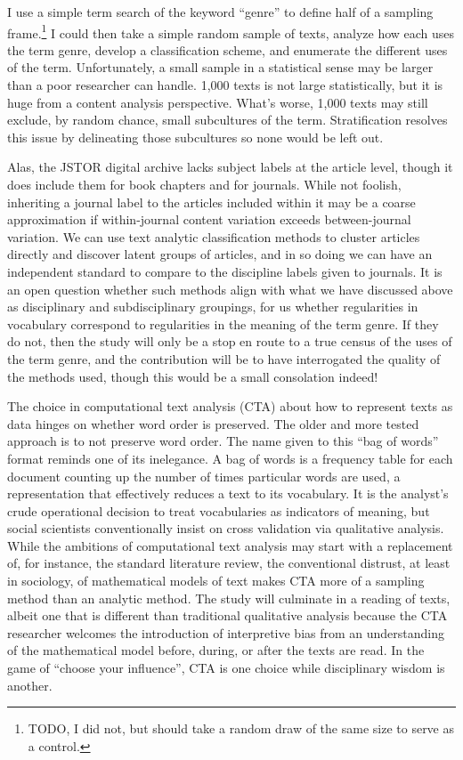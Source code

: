 \documentclass[]{book}
\let\rmarkdownfootnote\footnote%
\def\footnote{\protect\rmarkdownfootnote}
\theoremstyle{definition}
\theoremstyle{definition}
\theoremstyle{definition}
\theoremstyle{remark}
\begin{document}
I use a simple term search of the keyword ``genre'' to define half of a
sampling frame.\footnote{TODO, I did not, but should take a random draw
  of the same size to serve as a control.} I could then take a simple
random sample of texts, analyze how each uses the term genre, develop a
classification scheme, and enumerate the different uses of the term.
Unfortunately, a small sample in a statistical sense may be larger than
a poor researcher can handle. 1,000 texts is not large statistically,
but it is huge from a content analysis perspective. What's worse, 1,000
texts may still exclude, by random chance, small subcultures of the
term. Stratification resolves this issue by delineating those
subcultures so none would be left out.

Alas, the JSTOR digital archive lacks subject labels at the article
level, though it does include them for book chapters and for journals.
While not foolish, inheriting a journal label to the articles included
within it may be a coarse approximation if within-journal content
variation exceeds between-journal variation. We can use text analytic
classification methods to cluster articles directly and discover latent
groups of articles, and in so doing we can have an independent standard
to compare to the discipline labels given to journals. It is an open
question whether such methods align with what we have discussed above as
disciplinary and subdisciplinary groupings, for us whether regularities
in vocabulary correspond to regularities in the meaning of the term
genre. If they do not, then the study will only be a stop en route to a
true census of the uses of the term genre, and the contribution will be
to have interrogated the quality of the methods used, though this would
be a small consolation indeed!

The choice in computational text analysis (CTA) about how to represent
texts as data hinges on whether word order is preserved. The older and
more tested approach is to not preserve word order. The name given to
this ``bag of words'' format reminds one of its inelegance. A bag of
words is a frequency table for each document counting up the number of
times particular words are used, a representation that effectively
reduces a text to its vocabulary. It is the analyst's crude operational
decision to treat vocabularies as indicators of meaning, but social
scientists conventionally insist on cross validation via qualitative
analysis. While the ambitions of computational text analysis may start
with a replacement of, for instance, the standard literature review, the
conventional distrust, at least in sociology, of mathematical models of
text makes CTA more of a sampling method than an analytic method. The
study will culminate in a reading of texts, albeit one that is different
than traditional qualitative analysis because the CTA researcher
welcomes the introduction of interpretive bias from an understanding of
the mathematical model before, during, or after the texts are read. In
the game of ``choose your influence'', CTA is one choice while
disciplinary wisdom is another.
\end{document}
